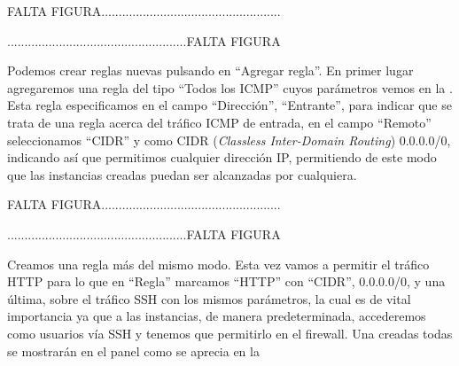 \begin{tcolorbox}[colback=green!5!white,colframe=green!75!black]
FALTA FIGURA....................................................

....................................................FALTA FIGURA
\end{tcolorbox}

Podemos crear reglas nuevas pulsando en “Agregar regla”. En primer lugar agregaremos una regla del tipo “Todos los ICMP” cuyos parámetros vemos en la %
. Esta regla especificamos en el campo “Dirección”, “Entrante”, para indicar que se trata de una regla acerca del tráfico ICMP de entrada, en el campo “Remoto” seleccionamos “CIDR” y como CIDR (\textit{Classless Inter-Domain Routing}) 0.0.0.0/0, indicando así que permitimos cualquier dirección IP, permitiendo de este modo que las instancias creadas puedan ser alcanzadas por cualquiera.

\begin{tcolorbox}[colback=green!5!white,colframe=green!75!black]
FALTA FIGURA....................................................

....................................................FALTA FIGURA
\end{tcolorbox}

Creamos una regla más del mismo modo. Esta vez vamos a permitir el tráfico HTTP para lo que en “Regla” marcamos “HTTP” con “CIDR”, 0.0.0.0/0, y una última, sobre el tráfico SSH con los mismos parámetros, la cual es de vital importancia ya que a las instancias, de manera predeterminada, accederemos como usuarios vía SSH y tenemos que permitirlo en el firewall. Una creadas todas se mostrarán en el panel como se aprecia en la %

